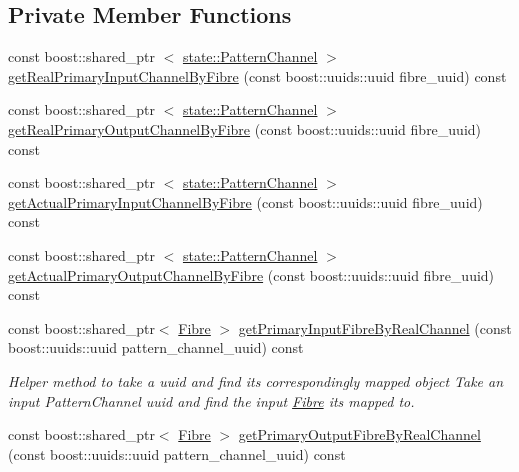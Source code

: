 \subsection*{\-Private \-Member \-Functions}
\begin{DoxyCompactItemize}
\item 
const boost\-::shared\-\_\-ptr\*
$<$ \hyperlink{classcryomesh_1_1state_1_1PatternChannel}{state\-::\-Pattern\-Channel} $>$ \hyperlink{classcryomesh_1_1structures_1_1Bundle_a51eb35ecb02094016f0f3a74fd07f6e9}{get\-Real\-Primary\-Input\-Channel\-By\-Fibre} (const boost\-::uuids\-::uuid fibre\-\_\-uuid) const 
\item 
const boost\-::shared\-\_\-ptr\*
$<$ \hyperlink{classcryomesh_1_1state_1_1PatternChannel}{state\-::\-Pattern\-Channel} $>$ \hyperlink{classcryomesh_1_1structures_1_1Bundle_a00eb0f18cc3331a4e6d0ed4698e92cb5}{get\-Real\-Primary\-Output\-Channel\-By\-Fibre} (const boost\-::uuids\-::uuid fibre\-\_\-uuid) const 
\item 
const boost\-::shared\-\_\-ptr\*
$<$ \hyperlink{classcryomesh_1_1state_1_1PatternChannel}{state\-::\-Pattern\-Channel} $>$ \hyperlink{classcryomesh_1_1structures_1_1Bundle_a101bda3e32c34cf8e0cff4526446af02}{get\-Actual\-Primary\-Input\-Channel\-By\-Fibre} (const boost\-::uuids\-::uuid fibre\-\_\-uuid) const 
\item 
const boost\-::shared\-\_\-ptr\*
$<$ \hyperlink{classcryomesh_1_1state_1_1PatternChannel}{state\-::\-Pattern\-Channel} $>$ \hyperlink{classcryomesh_1_1structures_1_1Bundle_a13dcea26d3379199f9e993caa5e132d7}{get\-Actual\-Primary\-Output\-Channel\-By\-Fibre} (const boost\-::uuids\-::uuid fibre\-\_\-uuid) const 
\item 
const boost\-::shared\-\_\-ptr$<$ \hyperlink{classcryomesh_1_1structures_1_1Fibre}{\-Fibre} $>$ \hyperlink{classcryomesh_1_1structures_1_1Bundle_ae1259ecf25a6b140cad735defd9069f9}{get\-Primary\-Input\-Fibre\-By\-Real\-Channel} (const boost\-::uuids\-::uuid pattern\-\_\-channel\-\_\-uuid) const 
\begin{DoxyCompactList}\small\item\em \-Helper method to take a uuid and find its correspondingly mapped object \-Take an input \-Pattern\-Channel uuid and find the input \hyperlink{classcryomesh_1_1structures_1_1Fibre}{\-Fibre} its mapped to. \end{DoxyCompactList}\item 
const boost\-::shared\-\_\-ptr$<$ \hyperlink{classcryomesh_1_1structures_1_1Fibre}{\-Fibre} $>$ \hyperlink{classcryomesh_1_1structures_1_1Bundle_a7ba3f747f8e164f0c0984fdb14922e7a}{get\-Primary\-Output\-Fibre\-By\-Real\-Channel} (const boost\-::uuids\-::uuid pattern\-\_\-channel\-\_\-uuid) const 

\end{DoxyCompactItemize}
